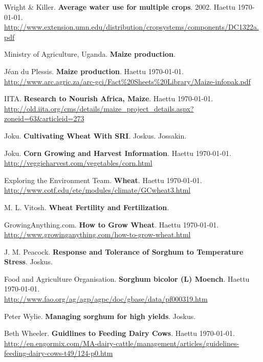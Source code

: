 \documentclass[12pt]{scrreprt}
\renewcommand\emph{\textbf}
\begin{document}
  \begin{thebibliography}{9}

    Wright \& Killer.
    \emph{Average water use for multiple crops}.
    2002.
    Haettu \today. \\
    \url{http://www.extension.umn.edu/distribution/cropsystems/components/DC1322a.pdf}

    Ministry of Agriculture, Uganda.
    \emph{Maize production}.

    Jéan du Plessis.
    \emph{Maize production}.
    Haettu \today. \\
    \url{http://www.arc.agric.za/arc-gci/Fact%20Sheets%20Library/Maize-infopak.pdf}

    IITA.
    \emph{Research to Nourish Africa, Maize}.
    Haettu \today. \\
    \url{http://old.iita.org/cms/details/maize_project_details.aspx?zoneid=63&articleid=273}

    Joku.
    \emph{Cultivating Wheat With SRI}.
    Joskus.
    Jossakin.

    Joku.
    \emph{Corn Growing and Harvest Information}.
    Haettu \today. \\
    \url{http://veggieharvest.com/vegetables/corn.html}

    Exploring the Environment Team.
    \emph{Wheat}.
    Haettu \today. \\
    \url{http://www.cotf.edu/ete/modules/climate/GCwheat3.html}

    M. L. Vitosh.
    \emph{Wheat Fertility and Fertilization}.

    GrowingAnything.com.
    \emph{How to Grow Wheat}.
    Haettu \today. \\
    \url{http://www.growinganything.com/how-to-grow-wheat.html}
        
    J. M. Peacock.
    \emph{Response and Tolerance of Sorghum to Temperature Stress}.
    Joskus.

    Food and Agriculture Organisation.
    \emph{Sorghum bicolor (L) Moench}.
    Haettu \today. \\
    \url{http://www.fao.org/ag/agp/agpc/doc/gbase/data/pf000319.htm}

    Peter Wylie.
    \emph{Managing sorghum for high yields}.
    Joskus.

    Beth Wheeler.
    \emph{Guidlines to Feeding Dairy Cows}.
    Haettu \today.
    \url{http://en.engormix.com/MA-dairy-cattle/management/articles/guidelines-feeding-dairy-cows-t49/124-p0.htm}

  \end{thebibliography}
\end{document}
